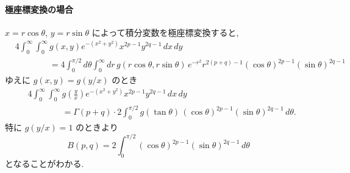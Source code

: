 \documentclass[12pt,twoside]{jarticle}
\theoremstyle{jplain}
\theoremstyle{jplain}
\theoremstyle{jplain}
\numberwithin{theorem}{section}
\numberwithin{equation}{section}
\numberwithin{figure}{section}
\numberwithin{table}{section}
\begin{document}
\paragraph{極座標変換の場合}
$x=r\cos\theta$, $y=r\sin\theta$ によって積分変数を極座標変換すると,
\begin{align*}
&
4\int_0^\infty\int_0^\infty g(x,y)e^{-(x^2+y^2)}x^{2p-1}y^{2q-1}\,dx\,dy
\\ & \qquad\qquad
=
4\int_0^{\pi/2}d\theta\int_0^\infty dr\, 
g(r\cos\theta,r\sin\theta)\,e^{-r^2}r^{2(p+q)-1} (\cos\theta)^{2p-1}(\sin\theta)^{2q-1}
\end{align*}
ゆえに $g(x,y)=g(y/x)$ のとき
\begin{align*}
&
4\int_0^\infty\int_0^\infty g\left(\frac{y}{x}\right)e^{-(x^2+y^2)}x^{2p-1}y^{2q-1}\,dx\,dy
\\ & \qquad\qquad
=
\Gamma(p+q)\cdot
2\int_0^{\pi/2} g(\tan\theta)\,(\cos\theta)^{2p-1}(\sin\theta)^{2q-1}\,d\theta.
\end{align*}
特に $g(y/x)=1$ のときより
\[
B(p,q) = 2\int_0^{\pi/2} (\cos\theta)^{2p-1}(\sin\theta)^{2q-1}\,d\theta
\]
となることがわかる.
\end{document}

